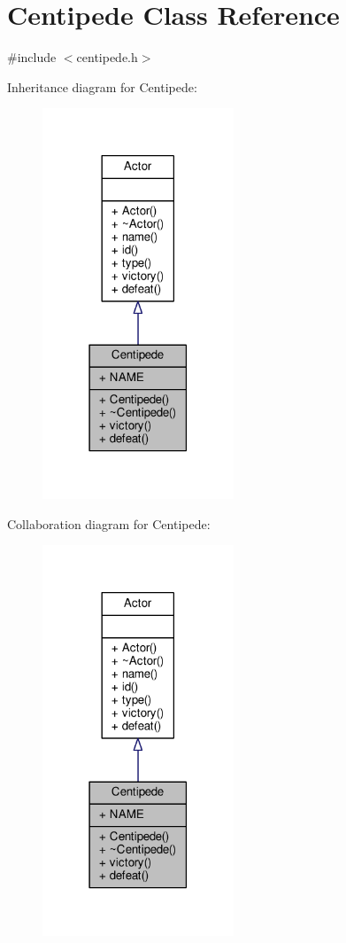 \hypertarget{classCentipede}{}\section{Centipede Class Reference}
\label{classCentipede}


{\ttfamily \#include $<$centipede.\+h$>$}



Inheritance diagram for Centipede\+:
\nopagebreak
\begin{figure}[H]
\begin{center}
\leavevmode
\includegraphics[width=162pt]{classCentipede__inherit__graph}
\end{center}
\end{figure}


Collaboration diagram for Centipede\+:
\nopagebreak
\begin{figure}[H]
\begin{center}
\leavevmode
\includegraphics[width=162pt]{classCentipede__coll__graph}
\end{center}
\end{figure}
